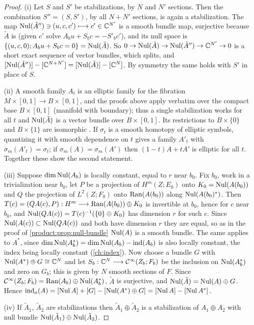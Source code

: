 \begin{proof}
(i) Let $S$ and $S'$ be stabilizations, by $N$ and $N'$ sections. Then the
combination $S''=(S,S')$, by all $N+N'$ sections, is again a stabilization. The
map $\operatorname{Nul}(\tilde A'')\ni(u,c,c')\longmapsto c'\in\mathbb{C}^{N'}$ is a smooth bundle map,
surjective because $\tilde A$ is (given $c'$ solve $A_bu+S_bc=-S'_bc'$), and its
null space is $\{(u,c,0);A_bu+S_bc=0\}=\operatorname{Nul}(\tilde A)$. So
$0\to\operatorname{Nul}(\tilde A)\to\operatorname{Nul}(\tilde A'')\to\mathbb{C}^{N'}\to0$ is a short exact sequence of
vector bundles, which splits, and
$[\operatorname{Nul}(\tilde A'')]-[\mathbb{C}^{N+N'}]=[\operatorname{Nul}(\tilde A)]-[\mathbb{C}^N]$. By symmetry the same
holds with $S'$ in place of $S$.

(ii) A smooth family $A_t$ is an elliptic family for the fibration
$M\times[0,1]\longrightarrow B\times[0,1]$, and the proofs above apply verbatim
over the compact base $B\times[0,1]$ (manifold with boundary); thus a single
stabilization works for all $t$ and $\operatorname{Nul}(\tilde A)$ is a vector bundle over
$B\times[0,1]$. Its restrictions to $B\times\{0\}$ and $B\times\{1\}$ are
isomorphic \cite{Atiyah-K}. If $\sigma_t$ is a smooth homotopy of elliptic
symbols, quantizing it with smooth dependence on $t$ gives a family $A'_t$ with
$\sigma_m(A'_t)=\sigma_t$; if $\sigma_m(A)=\sigma_m(A')$ then $(1-t)A+tA'$ is
elliptic for all $t$. Together these show the second statement.

(iii) Suppose $\dim\operatorname{Nul}(A_b)$ is locally constant, equal to $r$ near $b_0$. Fix
$b_0$, work in a
trivialization near $b_0$, let $P$ be a projection of $H^m(Z;E_0)$ onto
$K_0=\operatorname{Nul}(A(b_0))$ and $Q$ the projection of $L^2(Z;F_0)$ onto $\operatorname{Ran}(A(b_0))$
along $\operatorname{Nul}(A(b_0)^*)$. Then $T(c)=(QA(c),P):H^m\longrightarrow
\operatorname{Ran}(A(b_0))\oplus K_0$ is invertible at $b_0$, hence for $c$ near $b_0$, and
$\operatorname{Nul}(QA(c))=T(c)^{-1}(\{0\}\oplus K_0)$ has dimension $r$ for such $c$. Since
$\operatorname{Nul}(A(c))\subset\operatorname{Nul}(QA(c))$ and both have dimension $r$ they are equal, so as
in the proof of \cref{product:prop:null-bundle} $\operatorname{Nul}(A)$ is a smooth bundle.
The same applies to $A^*$, since $\dim\operatorname{Nul}(A^*_b)=\dim\operatorname{Nul}(A_b)-\operatorname{ind}(A_b)$ is
also locally constant, the index being locally constant (\cref{ch:index}).
Now choose a bundle $G$ with $\operatorname{Nul}(A^*)\oplus G\cong\mathbb{C}^N$ and let
$S_b:\mathbb{C}^N\longrightarrow\mathcal{C}^\infty(Z_b;F_b)$ be the inclusion on $\operatorname{Nul}(A^*_b)$ and zero
on $G_b$; this is given by $N$ smooth sections of $F$. Since
$\mathcal{C}^\infty(Z_b;F_b)=\operatorname{Ran}(A_b)\oplus\operatorname{Nul}(A_b^*)$, $\tilde A$ is surjective, and
$\operatorname{Nul}(\tilde A)=\operatorname{Nul}(A)\oplus G$. Hence
$\operatorname{ind}_a(A)=[\operatorname{Nul} A]+[G]-[\operatorname{Nul}(A^*)\oplus G]=[\operatorname{Nul} A]-[\operatorname{Nul} A^*]$.

(iv) If $\tilde A_1$, $\tilde A_2$ are stabilizations then
$\tilde A_1\oplus\tilde A_2$ is a stabilization of $A_1\oplus A_2$ with null
bundle $\operatorname{Nul}(\tilde A_1)\oplus\operatorname{Nul}(\tilde A_2)$.
\end{proof}

